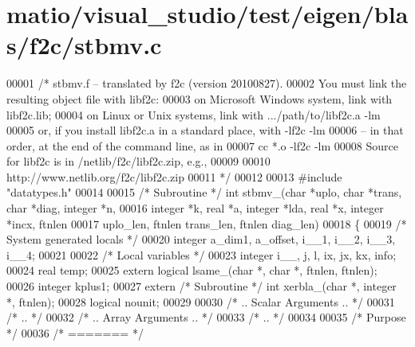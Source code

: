 \hypertarget{matio_2visual__studio_2test_2eigen_2blas_2f2c_2stbmv_8c_source}{}\section{matio/visual\+\_\+studio/test/eigen/blas/f2c/stbmv.c}
\label{matio_2visual__studio_2test_2eigen_2blas_2f2c_2stbmv_8c_source}

\begin{DoxyCode}
00001 \textcolor{comment}{/* stbmv.f -- translated by f2c (version 20100827).}
00002 \textcolor{comment}{   You must link the resulting object file with libf2c:}
00003 \textcolor{comment}{    on Microsoft Windows system, link with libf2c.lib;}
00004 \textcolor{comment}{    on Linux or Unix systems, link with .../path/to/libf2c.a -lm}
00005 \textcolor{comment}{    or, if you install libf2c.a in a standard place, with -lf2c -lm}
00006 \textcolor{comment}{    -- in that order, at the end of the command line, as in}
00007 \textcolor{comment}{        cc *.o -lf2c -lm}
00008 \textcolor{comment}{    Source for libf2c is in /netlib/f2c/libf2c.zip, e.g.,}
00009 \textcolor{comment}{}
00010 \textcolor{comment}{        http://www.netlib.org/f2c/libf2c.zip}
00011 \textcolor{comment}{*/}
00012 
00013 \textcolor{preprocessor}{#include "datatypes.h"}
00014 
00015 \textcolor{comment}{/* Subroutine */} \textcolor{keywordtype}{int} stbmv\_(\textcolor{keywordtype}{char} *uplo, \textcolor{keywordtype}{char} *trans, \textcolor{keywordtype}{char} *diag, integer *n, 
00016     integer *k, real *a, integer *lda, real *x, integer *incx, ftnlen 
00017     uplo\_len, ftnlen trans\_len, ftnlen diag\_len)
00018 \{
00019     \textcolor{comment}{/* System generated locals */}
00020     integer a\_dim1, a\_offset, i\_\_1, i\_\_2, i\_\_3, i\_\_4;
00021 
00022     \textcolor{comment}{/* Local variables */}
00023     integer i\_\_, j, l, ix, jx, kx, info;
00024     real temp;
00025     \textcolor{keyword}{extern} logical lsame\_(\textcolor{keywordtype}{char} *, \textcolor{keywordtype}{char} *, ftnlen, ftnlen);
00026     integer kplus1;
00027     \textcolor{keyword}{extern} \textcolor{comment}{/* Subroutine */} \textcolor{keywordtype}{int} xerbla\_(\textcolor{keywordtype}{char} *, integer *, ftnlen);
00028     logical nounit;
00029 
00030 \textcolor{comment}{/*     .. Scalar Arguments .. */}
00031 \textcolor{comment}{/*     .. */}
00032 \textcolor{comment}{/*     .. Array Arguments .. */}
00033 \textcolor{comment}{/*     .. */}
00034 
00035 \textcolor{comment}{/*  Purpose */}
00036 \textcolor{comment}{/*  ======= */}

\end{DoxyCode}
